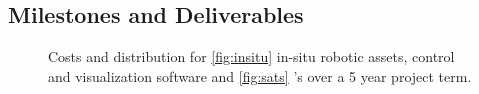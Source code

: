 \documentclass[12pt]{article}
\begin{document}

\subsection{Milestones and Deliverables}


\begin{figure}[!t]
  \centering
  \caption{Costs and distribution for \ref{fig:insitu} in-situ robotic
    assets, control and visualization software and \ref{fig:sats}
    \smle's over a 5 year project term.}
  \label{fig:costs}
  \vspace{-0.5cm}
\end{figure}
\end{document}
